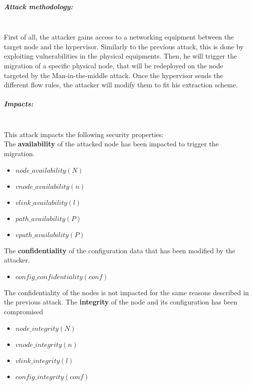 \subparagraph{Attack methodology:}\textbf{\\}
First of all, the attacker gains access to a networking equipment between the target node and the hypervisor. Similarly to the previous attack, this is done by exploiting vulnerabilities in the physical equipments.
Then, he will trigger the migration of a specific physical node, that will be redeployed on the node targeted by the Man-in-the-middle attack.
Once the hypervisor sends the different flow rules, the attacker will modify them to fit his extraction scheme.



\subparagraph{Impacts:}\textbf{\\}
This attack impacts the following security properties:\\
The \textbf{availability} of the attacked node has been impacted to trigger the migration.
\begin{itemize}
    \item $node\_availability(N)$
    \item $vnode\_availability(n)$
    \item $vlink\_availability(l)$
    \item $path\_availability(P)$
    \item $vpath\_availability(P)$
\end{itemize}
The \textbf{confidentiality} of the configuration data that has been modified by the attacker.\\
\begin{itemize}
    \item $config\_confidentiality(conf)$
\end{itemize}
The confidentiality of the nodes is not impacted for the same reasons described in the previous attack.
The \textbf{integrity} of the node and its configuration has been compromised
    \begin{itemize}
    \item $node\_integrity(N)$
    \item $vnode\_integrity(n)$
    \item $vlink\_integrity(l)$
    \item $config\_integrity(conf)$
\end{itemize}


